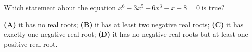 Which statement about the equation $x^6-3x^5-6x^3-x+8=0$ is true?

\textbf{(A)} it has no real roots; \quad
\textbf{(B)} it has at least two negative real roots; \quad
\textbf{(C)} it has exactly one negative real root; \quad
\textbf{(D)} it has no negative real roots but at least one positive real root.
